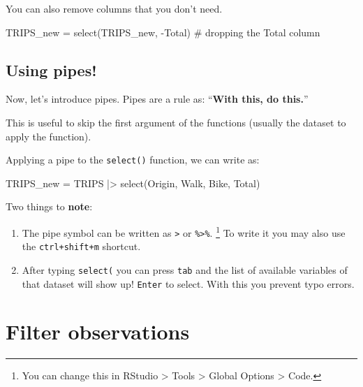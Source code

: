 \documentclass[
  letterpaper,
  DIV=11,
  numbers=noendperiod]{scrreprt}
\newenvironment{Shaded}{\begin{snugshade}}{\end{snugshade}}
\newcommand{\CommentTok}[1]{\textcolor[rgb]{0.37,0.37,0.37}{#1}}
\newcommand{\FunctionTok}[1]{\textcolor[rgb]{0.28,0.35,0.67}{#1}}
\newcommand{\NormalTok}[1]{\textcolor[rgb]{0.00,0.23,0.31}{#1}}
\newcommand{\OtherTok}[1]{\textcolor[rgb]{0.00,0.23,0.31}{#1}}
\newcommand{\SpecialCharTok}[1]{\textcolor[rgb]{0.37,0.37,0.37}{#1}}
\begin{document}
You can also remove columns that you don't need.

\begin{Shaded}
\begin{Highlighting}[]
\NormalTok{TRIPS\_new }\OtherTok{=} \FunctionTok{select}\NormalTok{(TRIPS\_new, }\SpecialCharTok{{-}}\NormalTok{Total) }\CommentTok{\# dropping the Total column}
\end{Highlighting}
\end{Shaded}

\subsection{Using pipes!}\label{using-pipes}

Now, let's introduce pipes. Pipes are a rule as: ``\textbf{With this, do
this.}''

This is useful to skip the first argument of the functions (usually the
dataset to apply the function).

Applying a pipe to the \texttt{select()} function, we can write as:

\begin{Shaded}
\begin{Highlighting}[]
\NormalTok{TRIPS\_new }\OtherTok{=}\NormalTok{ TRIPS }\SpecialCharTok{|\textgreater{}} \FunctionTok{select}\NormalTok{(Origin, Walk, Bike, Total)}
\end{Highlighting}
\end{Shaded}

Two things to \textbf{note}:

\begin{enumerate}
\def\labelenumi{\arabic{enumi}.}
\item
  The pipe symbol can be written as \texttt{\textbar{}\textgreater{}} or
  \texttt{\%\textgreater{}\%}. \footnote{You can change this in RStudio
    \textgreater{} Tools \textgreater{} Global Options \textgreater{}
    Code.} To write it you may also use the \texttt{ctrl+shift+m}
  shortcut.
\item
  After typing \texttt{select(} you can press \texttt{tab} and the list
  of available variables of that dataset will show up! \texttt{Enter} to
  select. With this you prevent typo errors.
\end{enumerate}

\section{Filter observations}\label{filter-observations}
\end{document}
